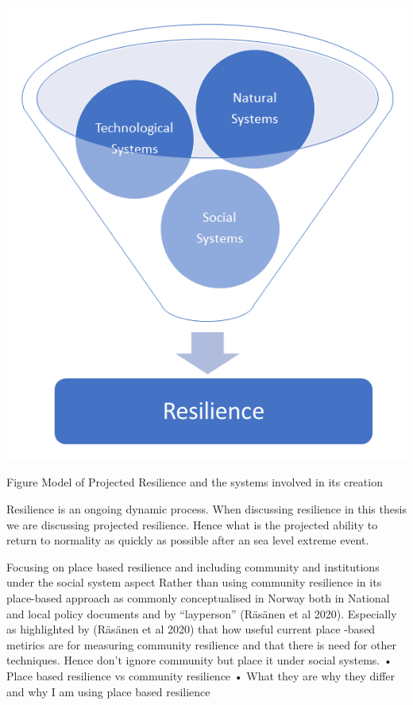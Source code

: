 \documentclass{article}
\begin{document}
\includegraphics[width=1\textwidth]{fig_theory/resilience model .png}

\begin{frame}{Figure Model of Projected Resilience and the systems involved in its creation }
\end{frame}


    



Resilience is an ongoing dynamic process. When discussing resilience in this thesis we are discussing projected resilience. Hence what is the projected ability to return to normality as quickly as possible after an sea level extreme event. 
 
Focusing on place based resilience and including community and institutions under the social system aspect
Rather than using community resilience in its place-based approach as commonly conceptualised in Norway both in National and local policy documents and by “layperson” (Räsänen et al 2020). Especially as highlighted by (Räsänen et al 2020) that how useful current place -based metirics are for measuring community resilience and that there is need for other techniques. Hence don’t ignore community but place it under social systems. 
•	Place based resilience vs community resilience
•	What they are why they differ and why I am using place based resilience
\end{document}

